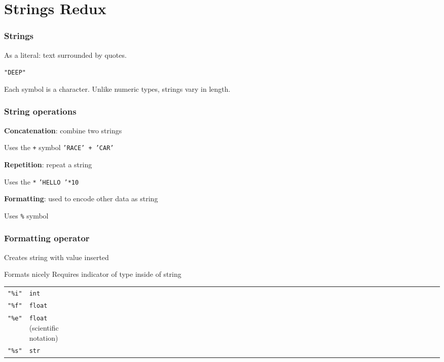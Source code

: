 \documentclass[11pt]{beamer}
\begin{document}
\section{Strings Redux}

\begin{frame}
  \frametitle{Strings}
  \Enlarge

  \begin{itemize}
  \myitem  As a literal:  text surrounded by quotes.
    \begin{itemize}
    \mysubitem  \texttt{"DEEP"}
    \end{itemize}
  \myitem  Each symbol is a character.
  \myitem  Unlike numeric types, strings vary in length.
  \end{itemize}
\end{frame}

\begin{frame}
  \frametitle{String operations}
  \Enlarge

  \begin{itemize}
  \myitem  \textbf{Concatenation}:  combine two strings
    \begin{itemize}
    \mysubitem  Uses the \texttt{+} symbol
    \mysubitem  \texttt{'RACE' + 'CAR'}
    \end{itemize}
  \myitem  \textbf{Repetition}:  repeat a string
    \begin{itemize}
    \mysubitem  Uses the \texttt{*}
    \mysubitem  \texttt{'HELLO '*10}
    \end{itemize}
  \myitem  \textbf{Formatting}:  used to encode other data as string
    \begin{itemize}
    \mysubitem  Uses \texttt{\%} symbol
    \end{itemize}
  \end{itemize}
\end{frame}

\begin{frame}
  \frametitle{Formatting operator}
  \Enlarge

  \begin{itemize}
  \myitem  Creates string with value inserted
    \begin{itemize}
    \mysubitem  Formats nicely
    \mysubitem  Requires indicator of type inside of string
      \begin{tabular}{*{27}{ll}}
        \texttt{"\%i"} & \texttt{int} \\
        \texttt{"\%f"} & \texttt{float} \\
        \texttt{"\%e"} & \texttt{float} (scientific notation) \\
        \texttt{"\%s"} & \texttt{str}
      \end{tabular}
    \end{itemize}
  \end{itemize}
\end{frame}
\end{document}
